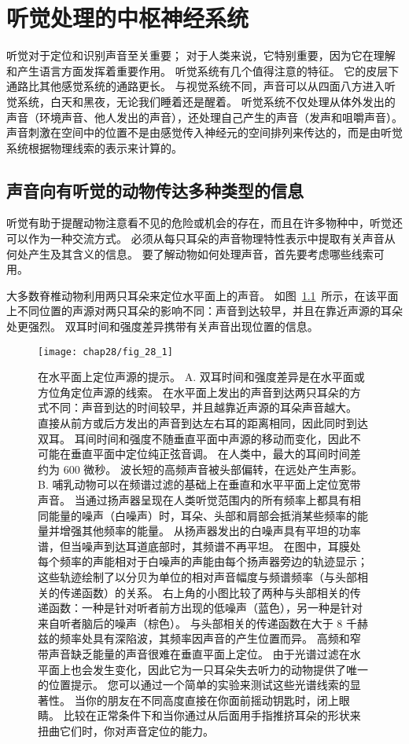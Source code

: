 \chapter{听觉处理的中枢神经系统} \label{chap:chap28}

听觉对于定位和识别声音至关重要；
对于人类来说，它特别重要，因为它在理解和产生语言方面发挥着重要作用。
听觉系统有几个值得注意的特征。
它的皮层下通路比其他感觉系统的通路更长。
与视觉系统不同，声音可以从四面八方进入听觉系统，白天和黑夜，无论我们睡着还是醒着。
听觉系统不仅处理从体外发出的声音（环境声音、他人发出的声音），还处理自己产生的声音（发声和咀嚼声音）。
声音刺激在空间中的位置不是由感觉传入神经元的空间排列来传达的，而是由听觉系统根据物理线索的表示来计算的。



\section{声音向有听觉的动物传达多种类型的信息}


听觉有助于提醒动物注意看不见的危险或机会的存在，而且在许多物种中，听觉还可以作为一种交流方式。
必须从每只耳朵的声音物理特性表示中提取有关声音从何处产生及其含义的信息。
要了解动物如何处理声音，首先要考虑哪些线索可用。


大多数脊椎动物利用两只耳朵来定位水平面上的声音。
如图~\ref{fig:28_1}~所示，在该平面上不同位置的声源对两只耳朵的影响不同：声音到达较早，并且在靠近声源的耳朵处更强烈。
双耳时间和强度差异携带有关声音出现位置的信息。



\begin{figure}[htbp]
	\centering
	\texttt{[image: chap28/fig\_28\_1]}
	\caption{在水平面上定位声源的提示。
	A. 双耳时间和强度差异是在水平面或方位角定位声源的线索。
	在水平面上发出的声音到达两只耳朵的方式不同：声音到达的时间较早，并且越靠近声源的耳朵声音越大。
	直接从前方或后方发出的声音到达左右耳的距离相同，因此同时到达双耳。
	耳间时间和强度不随垂直平面中声源的移动而变化，因此不可能在垂直平面中定位纯正弦音调。
	在人类中，最大的耳间时间差约为 600 微秒。
	波长短的高频声音被头部偏转，在远处产生声影\cite{geisler1998sound}。
	B. 哺乳动物可以在频谱过滤的基础上在垂直和水平平面上定位宽带声音。
	当通过扬声器呈现在人类听觉范围内的所有频率上都具有相同能量的噪声（白噪声）时，耳朵、头部和肩部会抵消某些频率的能量并增强其他频率的能量。
	从扬声器发出的白噪声具有平坦的功率谱，但当噪声到达耳道底部时，其频谱不再平坦。
	在图中，耳膜处每个频率的声能相对于白噪声的声能由每个扬声器旁边的轨迹显示； 
	这些轨迹绘制了以分贝为单位的相对声音幅度与频谱频率（与头部相关的传递函数）的关系。
	右上角的小图比较了两种与头部相关的传递函数：一种是针对听者前方出现的低噪声（蓝色），另一种是针对来自听者脑后的噪声（棕色）。
	与头部相关的传递函数在大于 8 千赫兹的频率处具有深陷波，其频率因声音的产生位置而异。
	高频和窄带声音缺乏能量的声音很难在垂直平面上定位。
	由于光谱过滤在水平面上也会发生变化，因此它为一只耳朵失去听力的动物提供了唯一的位置提示。
	您可以通过一个简单的实验来测试这些光谱线索的显著性。
	当你的朋友在不同高度直接在你面前摇动钥匙时，闭上眼睛。
	比较在正常条件下和当你通过从后面用手指推挤耳朵的形状来扭曲它们时，你对声音定位的能力。}
	\label{fig:28_1}
\end{figure}


